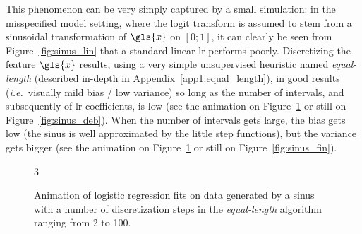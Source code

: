 This phenomenon can be very simply captured by a small simulation: in the misspecified model setting, where the logit transform is assumed to stem from a sinusoidal transformation of $\gls{x}$ on $[0;1]$, it can clearly be seen from Figure~\ref{fig:sinus_lin} that a standard linear \gls{lr} performs poorly. Discretizing the feature $\gls{x}$ results, using a very simple unsupervised heuristic named \textit{equal-length} (described in-depth in Appendix~\ref{app1:equal_length}), in good results (\textit{i.e.}\ visually mild bias / low variance) so long as the number of intervals, and subsequently of \gls{lr} coefficients, is low (see the animation on Figure~\ref{fig:anim_sinus} or still on Figure~\ref{fig:sinus_deb}). When the number of intervals gets large, the bias gets low (the sinus is well approximated by the little step functions), but the variance gets bigger (see the animation on Figure~\ref{fig:anim_sinus} or still on Figure~\ref{fig:sinus_fin}).



\begin{figure}[!ht]
\begin{animateinline}[poster=first, controls=all, palindrome, autopause, autoresume, width=\textwidth, height=7cm]{3}
%
\end{animateinline}
\caption{\label{fig:anim_sinus} Animation of logistic regression fits on data generated by a sinus with a number of discretization steps in the \textit{equal-length} algorithm ranging from 2 to 100.}
\end{figure}

